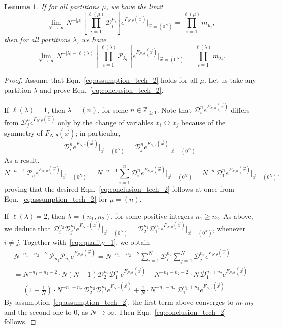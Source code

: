 \documentclass[11pt]{article}
\theoremstyle{plain}
\newtheorem{lemma}{Lemma}[section]
\renewcommand{\P}{\mathcal P}
\newcommand{\D}{\mathcal D}
\newcommand{\Z}{\mathbb Z}
\newcommand{\la}{\lambda}
\newcommand{\vecx}{\vec{x}}
\begin{document}
\begin{lemma}\label{lem:tech_2}
    If for all partitions $\mu$, we have the limit
    \begin{equation}\label{eq:assumption_tech_2}
    \lim_{N\to\infty}{ N^{-|\mu|}\left[ \prod_{i=1}^{\ell(\mu)}{\D_i^{\mu_i}} \right] e^{F_{N,\theta}(\vecx)} \bigg|_{\vecx=(0^N)} } = \prod_{i=1}^{\ell(\mu)}{m_{\mu_i}},
    \end{equation}
    then for all partitions $\la$, we have
    \begin{equation}\label{eq:conclusion_tech_2}
    \lim_{N\to\infty} N^{-|\la|-\ell(\la)}\left[ \prod_{i=1}^{\ell(\la)}{\P_{\la_i}} \right] e^{F_{N,\theta}(\vecx)} \bigg|_{\vecx=(0^N)} = \prod_{i=1}^{\ell(\la)}{m_{\la_i}}.
    \end{equation}
\end{lemma}
\begin{proof}
Assume that Eqn.~\eqref{eq:assumption_tech_2} holds for all $\mu$. Let us take any partition $\la$ and prove Eqn.~\eqref{eq:conclusion_tech_2}.

If $\ell(\la)=1$, then $\la=(n)$, for some $n\in\Z_{\ge 1}$.
Note that $\D_i^n e^{F_{N,\theta}(\vecx)}$ differs from $\D_j^n e^{F_{N,\theta}(\vecx)}$ only by the change of variables $x_i\leftrightarrow x_j$ because of the symmetry of $F_{N,\theta}(\vecx)$; in particular,
\begin{equation}\label{eq:equality_1}
\D_i^n e^{F_{N,\theta}(\vecx)}\big|_{\vecx=(0^N)} = \D_j^n e^{F_{N,\theta}(\vecx)}\big|_{\vecx=(0^N)}.
\end{equation}
As a result,
\begin{equation*}
N^{-n-1}\,\P_n e^{F_{N,\theta}(\vecx)} \Big|_{\vecx=(0^N)} = N^{-n-1}\sum_{i=1}^n{\D_i^n} e^{F_{N,\theta}(\vecx)} \Big|_{\vecx=(0^N)} = N^{-n}\,\D_1^n e^{F_{N,\theta}(\vecx)}\Big|_{\vecx=(0^N)},
\end{equation*}
proving that the desired Eqn.~\eqref{eq:conclusion_tech_2} follows at once from Eqn.~\eqref{eq:assumption_tech_2} for $\mu=(n)$.

\smallskip

If $\ell(\la)=2$, then $\la=(n_1,n_2)$, for some positive integers $n_1\ge n_2$. As above, we deduce that $\D_i^{n_2}\D_j^{n_1} e^{F_{N,\theta}(\vecx)}\big|_{\vecx=(0^N)} = \D_2^{n_2}\D_1^{n_1} e^{F_{N,\theta}(\vecx)}\big|_{\vecx=(0^N)}$, whenever $i\ne j$.
Together with~\eqref{eq:equality_1}, we obtain
\begin{multline*}
N^{-n_1-n_2-2}\,\P_{n_2}\P_{n_1} e^{F_{N,\theta}(\vecx)} = N^{-n_1-n_2-2}\sum_{i=1}^N{\D_i^{n_2}}\sum_{j=1}^N{\D_j^{n_1}} e^{F_{N,\theta}(\vecx)}\\
= N^{-n_1-n_2-2}\cdot N(N-1)\D_2^{n_2}\D_1^{n_1} e^{F_{N,\theta}(\vecx)} + N^{-n_1-n_2-2}\cdot N\,\D_1^{n_1+n_2} e^{F_{N,\theta}(\vecx)}\\
= \left(1-\frac{1}{N}\right)\cdot N^{-n_1-n_2}\,\D_2^{n_2}\D_1^{n_1}e^{F_{N,\theta}(\vecx)} + \frac{1}{N}\cdot N^{-n_1-n_2}\,\D_1^{n_1+n_2}e^{F_{N,\theta}(\vecx)}.
\end{multline*}
By assumption~\eqref{eq:assumption_tech_2}, the first term above converges to $m_1m_2$ and the second one to $0$, as $N\to\infty$.
Then Eqn.~\eqref{eq:conclusion_tech_2} follows.


\end{proof}
\end{document}

